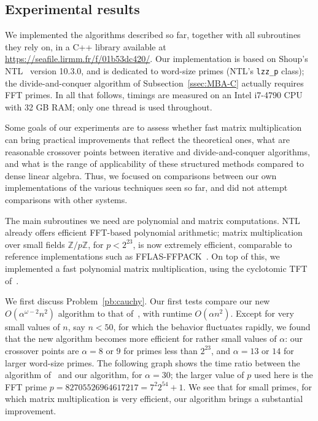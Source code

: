 \documentclass[sigconf]{acmart}
\newcommand{\Z}{\ensuremath{\mathbb{Z}}}
\newcommand{\todo}[1]{(\textbf{todo:} #1)}
\theoremstyle{acmdefinition}
\begin{document}

\vspace{-5px}
\subsection{Experimental results}\label{ssec:exp1}

We implemented the algorithms described so far, together with all
subroutines they rely on, in a C++ library available at
\url{https://seafile.lirmm.fr/f/01b53dc420/}. Our implementation
is based on Shoup's NTL~\cite{Shoup95,NTL} version 10.3.0, and is
dedicated to word-size primes (NTL's \texttt{lzz\_p} class); the
divide-and-conquer algorithm of Subsection~\ref{ssec:MBA-C} actually
requires FFT primes.  In all that follows, timings are measured on an
Intel i7-4790 CPU with 32 GB RAM; only one thread is used throughout.


Some goals of our experiments are to assess whether fast matrix
multiplication can bring practical improvements that reflect the
theoretical ones, what are reasonable crossover points between
iterative and divide-and-conquer algorithms, and what is the range of
applicability of these structured methods compared to dense linear
algebra.  Thus, we focused on comparisons between our own
implementations of the various techniques seen so far, and did not
attempt comparisons with other systems.

The main subroutines we need are polynomial and matrix
computations. NTL already offers efficient FFT-based polynomial
arithmetic; matrix multiplication over small fields $\Z/p\Z$, for $p <
2^{23}$, is now extremely efficient, comparable to reference
implementations such as FFLAS-FFPACK~\cite{fflas-ffpack}. On top of
this, we implemented a fast polynomial matrix multiplication, using
the cyclotomic TFT of~\cite{ArSc15}.

We first discuss Problem~\ref{pb:cauchy}. Our first tests compare our
new $O(\alpha^{\omega-2} n^2)$ algorithm to that
of~\cite{Mouilleron08}, with runtime $O(\alpha n^2)$. Except for very
small values of $n$, say $n < 50$, for which the behavior fluctuates
rapidly, we found that the new algorithm becomes more efficient for
rather small values of $\alpha$: our crossover points are $\alpha=8$
or $9$ for primes less than $2^{23}$, and $\alpha=13$ or $14$ for
larger word-size primes. The following graph shows the time ratio
between the algorithm of~\cite{Mouilleron08} and our algorithm, for
$\alpha=30$; the larger value of $p$ used here is the FFT prime
$p=82705526964617217=7^2 2^{54}+1$. We see that for small primes, for
which matrix multiplication is very efficient, our algorithm brings a
substantial improvement.
\end{document}
